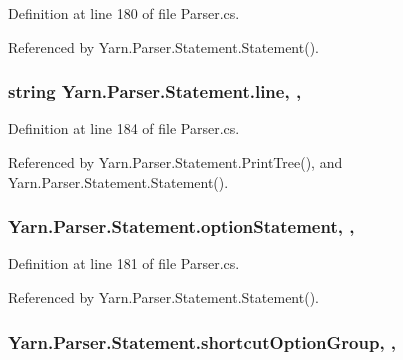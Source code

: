 Definition at line 180 of file Parser.\-cs.



Referenced by Yarn.\-Parser.\-Statement.\-Statement().

\hypertarget{a00166_a37695c7b00776bb292fd64894a70fb72}{
\subsubsection[{line}]{\setlength{\rightskip}{0pt plus 5cm}string Yarn.\-Parser.\-Statement.\-line\hspace{0.3cm}{\ttfamily [get]}, {\ttfamily [set]}, {\ttfamily [package]}}}\label{a00166_a37695c7b00776bb292fd64894a70fb72}


Definition at line 184 of file Parser.\-cs.



Referenced by Yarn.\-Parser.\-Statement.\-Print\-Tree(), and Yarn.\-Parser.\-Statement.\-Statement().

\hypertarget{a00166_a15020b7dab4983adbd185d5c2c2ebe84}{
\subsubsection[{option\-Statement}]{ Yarn.\-Parser.\-Statement.\-option\-Statement\hspace{0.3cm}{\ttfamily [get]}, {\ttfamily [set]}, {\ttfamily [package]}}}\label{a00166_a15020b7dab4983adbd185d5c2c2ebe84}


Definition at line 181 of file Parser.\-cs.



Referenced by Yarn.\-Parser.\-Statement.\-Statement().

\hypertarget{a00166_a54d73ad69c4af4a0d61edeaea4c8ca4f}{
\subsubsection[{shortcut\-Option\-Group}]{ Yarn.\-Parser.\-Statement.\-shortcut\-Option\-Group\hspace{0.3cm}{\ttfamily [get]}, {\ttfamily [set]}, {\ttfamily [package]}}}\label{a00166_a54d73ad69c4af4a0d61edeaea4c8ca4f}



